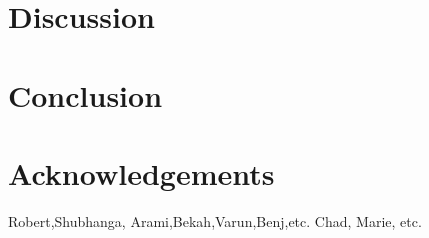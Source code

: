 \documentclass[letterpaper]{igs}
\begin{document}
\section{Discussion}\label{discussion}

\section{Conclusion}\label{conclusion}

\section{Acknowledgements}
Robert,Shubhanga, Arami,Bekah,Varun,Benj,etc.
Chad, Marie, etc.



\end{document}

